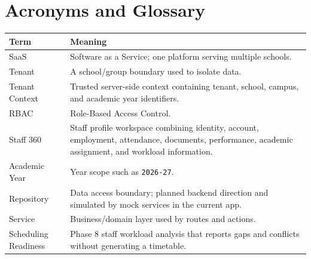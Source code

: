 \chapter*{Acronyms and Glossary}
\begin{longtable}{@{}p{}p{}@{}}
\toprule
\textbf{Term} & \textbf{Meaning}\\
\midrule
SaaS & Software as a Service; one platform serving multiple schools.\\
Tenant & A school/group boundary used to isolate data.\\
Tenant Context & Trusted server-side context containing tenant, school, campus, and academic year identifiers.\\
RBAC & Role-Based Access Control.\\
Staff 360 & Staff profile workspace combining identity, account, employment, attendance, documents, performance, academic assignment, and workload information.\\
Academic Year & Year scope such as \texttt{2026-27}.\\
Repository & Data access boundary; planned backend direction and simulated by mock services in the current app.\\
Service & Business/domain layer used by routes and actions.\\
Scheduling Readiness & Phase 8 staff workload analysis that reports gaps and conflicts without generating a timetable.\\
\bottomrule
\end{longtable}
\clearpage
